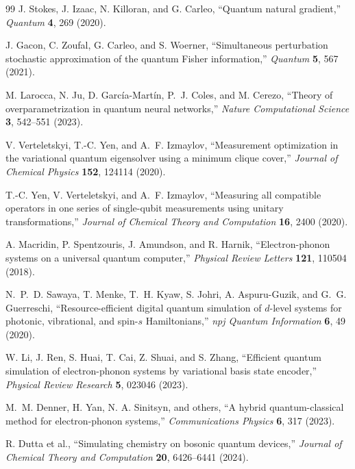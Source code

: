 \documentclass[
  reprint,
  amsmath,
  amssymb,
  aps,
  pra,
  nofootinbib,
  superscriptaddress,
  floatfix
]{revtex4-2}
\begin{document}
\begin{thebibliography}{99}
J. Stokes, J. Izaac, N. Killoran, and G. Carleo,
``Quantum natural gradient,''
\emph{Quantum} \textbf{4}, 269 (2020).

J. Gacon, C. Zoufal, G. Carleo, and S. Woerner,
``Simultaneous perturbation stochastic approximation of the quantum Fisher information,''
\emph{Quantum} \textbf{5}, 567 (2021).

M. Larocca, N. Ju, D. Garc{\'i}a-Mart{\'i}n, P.~J. Coles, and M. Cerezo,
``Theory of overparametrization in quantum neural networks,''
\emph{Nature Computational Science} \textbf{3}, 542--551 (2023).

V. Verteletskyi, T.-C. Yen, and A.~F. Izmaylov,
``Measurement optimization in the variational quantum eigensolver using a minimum clique cover,''
\emph{Journal of Chemical Physics} \textbf{152}, 124114 (2020).

T.-C. Yen, V. Verteletskyi, and A.~F. Izmaylov,
``Measuring all compatible operators in one series of single-qubit measurements using unitary transformations,''
\emph{Journal of Chemical Theory and Computation} \textbf{16}, 2400 (2020).


A. Macridin, P. Spentzouris, J. Amundson, and R. Harnik,
``Electron-phonon systems on a universal quantum computer,''
\emph{Physical Review Letters} \textbf{121}, 110504 (2018).

N.~P.~D. Sawaya, T. Menke, T.~H. Kyaw, S. Johri, A. Aspuru-Guzik, and G.~G. Guerreschi,
``Resource-efficient digital quantum simulation of $d$-level systems for photonic, vibrational, and spin-$s$ Hamiltonians,''
\emph{npj Quantum Information} \textbf{6}, 49 (2020).

W. Li, J. Ren, S. Huai, T. Cai, Z. Shuai, and S. Zhang,
``Efficient quantum simulation of electron-phonon systems by variational basis state encoder,''
\emph{Physical Review Research} \textbf{5}, 023046 (2023).

M.~M. Denner, H. Yan, N. A. Sinitsyn, and others,
``A hybrid quantum-classical method for electron-phonon systems,''
\emph{Communications Physics} \textbf{6}, 317 (2023).

R. Dutta et al.,
``Simulating chemistry on bosonic quantum devices,''
\emph{Journal of Chemical Theory and Computation} \textbf{20}, 6426--6441 (2024).


\end{thebibliography}
\end{document}
